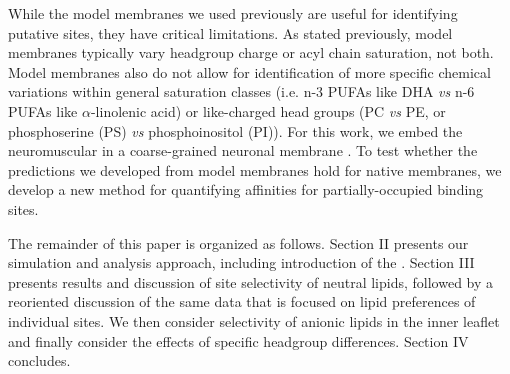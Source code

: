 While the model membranes we used previously are useful for identifying putative sites, they have critical limitations.  As stated previously, model membranes typically vary headgroup charge or acyl chain saturation, not both. Model membranes also do not allow for identification of more specific chemical variations within general saturation classes (i.e. n-3 PUFAs like DHA {\it vs} n-6 PUFAs like $\alpha$-linolenic acid) or like-charged head groups (PC {\it vs} PE, or phosphoserine (PS) {\it vs} phosphoinositol (PI)). For this work, we embed the neuromuscular \nachr\cite{Unwin2005} in a coarse-grained neuronal membrane \cite{Ingolfsson2017b}. To test whether the predictions we developed from model membranes hold for native membranes, we develop a new method for quantifying affinities for partially-occupied binding sites.%

 The remainder of this paper is organized as follows. Section II presents our simulation and analysis approach, including introduction of the \newaffinity.  Section III presents results and discussion of site selectivity of neutral lipids, followed by a reoriented discussion of the same data that is focused on lipid preferences of individual sites. We then consider selectivity of anionic lipids in the inner leaflet and finally consider the effects of specific headgroup differences.  Section IV concludes.  


